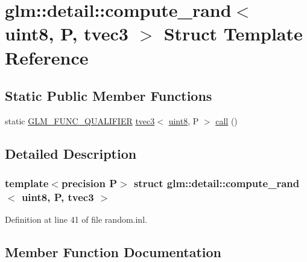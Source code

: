 \hypertarget{structglm_1_1detail_1_1compute__rand_3_01uint8_00_01_p_00_01tvec3_01_4}{}\section{glm\+::detail\+::compute\+\_\+rand$<$ uint8, P, tvec3 $>$ Struct Template Reference}
\label{structglm_1_1detail_1_1compute__rand_3_01uint8_00_01_p_00_01tvec3_01_4}
\subsection*{Static Public Member Functions}
\begin{DoxyCompactItemize}
\item 
static \mbox{\hyperlink{setup_8hpp_a33fdea6f91c5f834105f7415e2a64407}{G\+L\+M\+\_\+\+F\+U\+N\+C\+\_\+\+Q\+U\+A\+L\+I\+F\+I\+ER}} \mbox{\hyperlink{structglm_1_1tvec3}{tvec3}}$<$ \mbox{\hyperlink{namespaceglm_1_1detail_aef2588f97d090cc19fbbe0c74fe17c8f}{uint8}}, P $>$ \mbox{\hyperlink{structglm_1_1detail_1_1compute__rand_3_01uint8_00_01_p_00_01tvec3_01_4_a6c86825a493fcef72cb61f2ed94a2b52}{call}} ()
\end{DoxyCompactItemize}


\subsection{Detailed Description}
\subsubsection*{template$<$precision P$>$\newline
struct glm\+::detail\+::compute\+\_\+rand$<$ uint8, P, tvec3 $>$}



Definition at line 41 of file random.\+inl.



\subsection{Member Function Documentation}
\mbox{\label{structglm_1_1detail_1_1compute__rand_3_01uint8_00_01_p_00_01tvec3_01_4_a6c86825a493fcef72cb61f2ed94a2b52}} 
